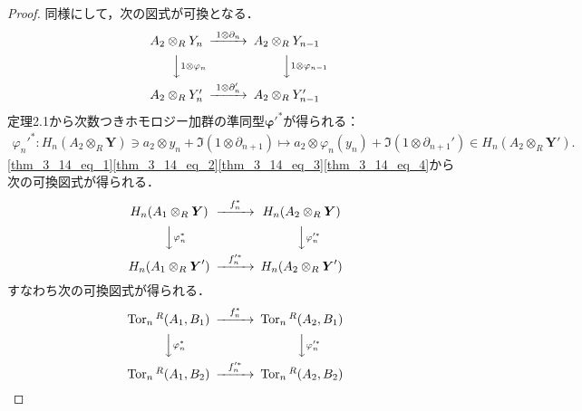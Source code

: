 \begin{proof}
  同様にして，次の図式が可換となる．
  \[
  \begin{CD}
    A_2 \otimes_R Y_n @>{1 \otimes \partial_n}>> A_2 \otimes_R Y_{n-1} \\
    @VV{1 \otimes \varphi_n}V @VV{1 \otimes \varphi_{n-1}}V \\
    A_2 \otimes_R Y_n' @>{1 \otimes \partial_n'}>> A_2 \otimes_R Y_{n-1}'
  \end{CD}
  \]
  定理2.1から次数つきホモロジー加群の準同型$\boldsymbol{\varphi}'^\ast$が得られる：
  \begin{align}
    \varphi_n'^{\ast} \colon H_n(A_2 \otimes_R \boldsymbol{Y}) \ni a_2 \otimes y_n + \Im (1 \otimes \partial_{n+1}) \mapsto a_2 \otimes \varphi_n(y_n) + \Im (1 \otimes \partial_{n+1}') \in H_n(A_2 \otimes_R \boldsymbol{Y}'). \label{thm_3_14_eq_4}
  \end{align}
  \eqref{thm_3_14_eq_1}\eqref{thm_3_14_eq_2}\eqref{thm_3_14_eq_3}\eqref{thm_3_14_eq_4}から次の可換図式が得られる．
  \[
  \begin{CD}
    H_n(A_1 \otimes_R \boldsymbol{Y}) @>{f_n^\ast}>> H_n(A_2 \otimes_R \boldsymbol{Y}) \\
    @VV{\varphi_n^\ast}V @VV{\varphi_n'^\ast}V \\
    H_n(A_1 \otimes_R \boldsymbol{Y}') @>{f_n'^\ast}>> H_n(A_2 \otimes_R \boldsymbol{Y}')
  \end{CD}
  \]
  すなわち次の可換図式が得られる．
  \[
  \begin{CD}
    \Tor_n{}^R(A_1, B_1) @>{f_n^\ast}>> \Tor_n{}^R(A_2, B_1) \\
    @VV{\varphi_n^\ast}V @VV{\varphi_n'^\ast}V \\
    \Tor_n{}^R(A_1, B_2) @>{f_n'^\ast}>> \Tor_n{}^R(A_2, B_2)
  \end{CD}
  \]
\end{proof}

